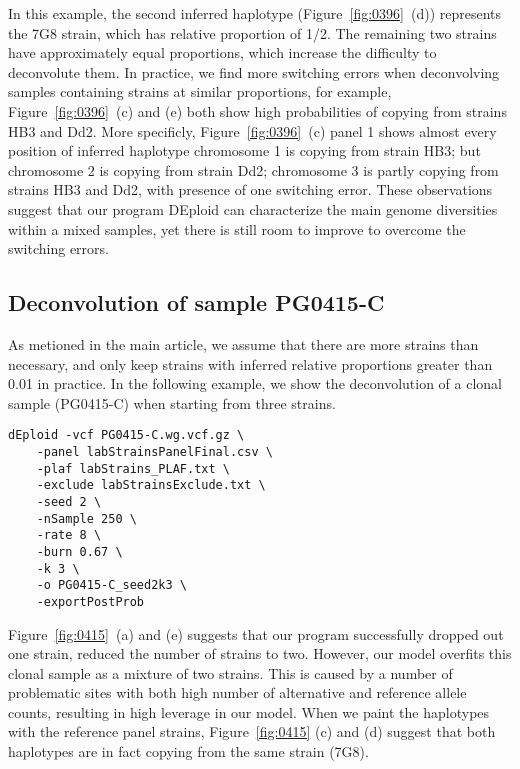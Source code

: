 \documentclass{article}
\begin{document}
In this example, the second inferred haplotype (Figure~\ref{fig:0396}~(d)) represents the 7G8 strain, which has relative proportion of 1/2. The remaining two strains have approximately equal proportions, which increase the difficulty to deconvolute them. In practice, we find more switching errors when deconvolving samples containing strains at similar proportions, for example, Figure~\ref{fig:0396}~(c) and (e) both show high probabilities of copying from strains HB3 and Dd2. More specificly, Figure~\ref{fig:0396}~(c) panel 1 shows almost every position of inferred haplotype chromosome 1 is copying from strain HB3; but chromosome 2 is copying from strain Dd2; chromosome 3 is partly copying from strains HB3 and Dd2, with presence of one switching error. These observations suggest that our program DEploid can characterize the main genome diversities within a mixed samples, yet there is still room to improve to overcome the switching errors.



\subsection{Deconvolution of sample {\textmd PG0415-C}}

As metioned in the main article, we assume that there are more strains than necessary, and only keep strains with inferred relative proportions greater than 0.01 in practice. In the following example, we show the deconvolution of a clonal sample ({\textmd PG0415-C}) when starting from three strains.

\linespread{1}
\begin{lstlisting}
dEploid -vcf PG0415-C.wg.vcf.gz \
    -panel labStrainsPanelFinal.csv \
    -plaf labStrains_PLAF.txt \
    -exclude labStrainsExclude.txt \
    -seed 2 \
    -nSample 250 \
    -rate 8 \
    -burn 0.67 \
    -k 3 \
    -o PG0415-C_seed2k3 \
    -exportPostProb
\end{lstlisting}


\linespread{1.5}

Figure~\ref{fig:0415}~(a) and (e) suggests that our program successfully dropped out one strain, reduced the number of strains to two. However, our model overfits this clonal sample as a mixture of two strains. This is caused by a number of problematic sites with both high number of alternative and reference allele counts, resulting in high leverage in our model. When we paint the haplotypes with the reference panel strains, Figure~\ref{fig:0415} (c) and (d) suggest that both haplotypes are in fact copying from the same strain (7G8).
\end{document}
